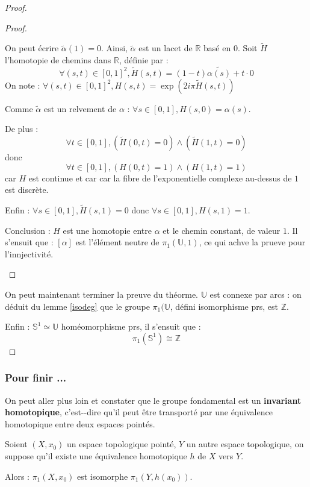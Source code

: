 \begin{proof}
\begin{proof}
\begin{itemize}
On peut \'ecrire $\tilde{\alpha}(1)=0$. Ainsi, $\tilde{\alpha}$ est un lacet de $\mathbb{R}$ bas\'e en $0$. Soit $\tilde{H}$ l'homotopie de chemins dans $\mathbb{R}$, d\'efinie par :
\[\forall (s,t)\in [0,1]^2,\tilde{H}(s,t)=(1-t)\tilde{\alpha (s)}+t\cdot 0\]
On note : $\forall (s,t)\in[0,1]^2,H(s,t)=\exp(2i\pi \tilde{H}(s,t))$

Comme $\tilde{\alpha}$ est un relvement de $\alpha$ : $\forall s\in[0,1],H(s,0)=\alpha (s)$. 

De plus :
\[\forall t\in[0,1],\left(\tilde{H}(0,t)=0\right)\wedge\left(\tilde{H}(1,t)=0\right)\]
donc
\[\forall t\in[0,1],\left(H(0,t)=1\right)\wedge\left(H(1,t)=1\right)\]
car $H$ est continue et car car la fibre de l'exponentielle complexe au-dessus de $1$ est discr\`ete.

Enfin : $\forall s\in[0,1],\tilde{H}(s,1)=0$ donc $\forall s\in[0,1],H(s,1)=1$.

Conclusion : $H$ est une homotopie entre $\alpha$ et le chemin constant, de valeur $1$. Il s'ensuit que : $[\alpha]$ est l'\'el\'ement neutre de $\pi_1(\mathbb{U},1)$, ce qui achve la prueve pour l'innjectivit\'e.
\end{itemize}
\end{proof}

On peut maintenant terminer la preuve du th\'eorme. $\mathbb{U}$ est connexe par arcs : on d\'eduit du lemme \ref{isodeg} que le groupe $\pi_1(\mathbb{U}$, d\'efini  isomorphisme prs, est $\mathbb{Z}$.

Enfin : $\mathbb{S}^1\simeq\mathbb{U}$  hom\'eomorphisme prs, il s'ensuit que :\[\pi_1(\mathbb{S}^1)\cong\mathbb{Z}\]
\end{proof}

\subsubsection{Pour finir ...}

On peut aller plus loin et constater que le groupe fondamental est un \textbf{invariant homotopique}, c'est--dire qu'il peut \^etre transport\'e par une \'equivalence homotopique entre deux espaces point\'es.

\begin{prop}
Soient $(X,x_0)$ un espace topologique point\'e, $Y$ un autre espace topologique, on suppose qu'il existe une \'equivalence homotopique $h$ de $X$ vers $Y$.

Alors : $\pi_1(X,x_0)$ est isomorphe  $\pi_1(Y,h(x_0))$.
\end{prop}

